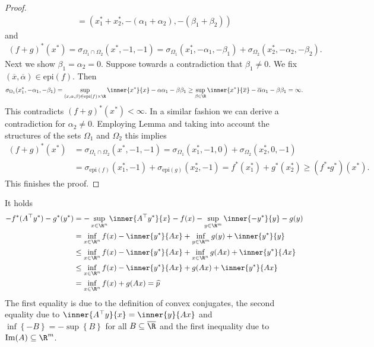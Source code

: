 \begin{proof}
\begin{gather}
    =
    (x^*_1+x^*_2,-(\alpha_1+\alpha_2),-(\beta_1+\beta_2))
  \end{gather}
  and
  \begin{gather}
    (f+g)^*(x^*)
    =
    \sigma_{\Omega_1\cap\Omega_2}
    (x^*,-1,-1)
    =
    \sigma_{\Omega_1}
    (x^*_1,-\alpha_1,-\beta_1)
    +
    \sigma_{\Omega_2}
    (x^*_2,-\alpha_2,-\beta_2).
  \end{gather}
  Next we show
  $\beta_1=\alpha_2=0.$
  Suppose towards a contradiction that 
  $\beta_1\neq 0.$ 
  We fix 
  $(\overline{x},\overline{\alpha})\in\mathrm{epi}(f).$
  Then
  \begin{gather}
    \sigma_{\Omega_1}
    (x^*_1,-\alpha_1,-\beta_1)
    =
    \sup_{(x,\alpha,\beta)\in \mathrm{epi}(f)\times \R}
    \inner{x^*}{x}-\alpha \alpha_1 -\beta \beta_1
    \ge
    \sup_{\beta\in \R}
    \inner{x^*}{\overline{x}}-\overline{\alpha} \alpha_1 -\beta \beta_1
    =\infty.
  \end{gather}
  This contradicts
  $
    (f+g)^*(x^*)<\infty.
  $
  In a similar fashion we can derive a contradiction for $\alpha_2\neq0.$
  Employing Lemma and taking into account the structures of the sets 
  $\Omega_1$ and $\Omega_2$ this implies
  \begin{align}
    (f+g)^*(x^*)
    &=
    \sigma_{\Omega_1\cap\Omega_2}
    (x^*,-1,-1)
    =
    \sigma_{\Omega_1}
    (x^*_1,-1,0)
    +
    \sigma_{\Omega_2}
    (x^*_2,0,-1)
    \\
    &=
    \sigma_{\mathrm{epi}(f)}(x^*_1,-1)
    +
    \sigma_{\mathrm{epi}(g)}(x^*_2,-1)
    =
    f^*(x^*_1)
    +
    g^*(x^*_2)
    \ge
    (f^*\square g^*)(x^*).
  \end{align}
  This finishes the proof.
\end{proof}
It holds
  \begin{align*}
    - f^*(A^\top y^*) - g^*(y^*) 
    &=
      -\sup_{x\in \R^n}\inner{A^\top y^*}{x}-f(x)
      -\sup_{y\in \R^m}\inner{-y^*}{y}-g(y)
      \\
    &=
    \inf_{x\in \R^n}f(x)-\inner{y^*}{Ax}
      +\inf_{y\in \R^m}g(y)+\inner{y^*}{y}
      \\
    &\le
      \inf_{x\in \R^n}f(x)-\inner{y^*}{Ax}
      +\inf_{x\in \R^n}g(Ax)+\inner{y^*}{Ax}
      \\
    &\le
      \inf_{x\in \R^n}f(x)-\inner{y^*}{Ax} + g(Ax) + \inner{y^*}{Ax}
      \\
    &=  
      \inf_{x\in \R^n}f(x)+g(Ax)
    =
      \widehat{p}
  \end{align*}
  The first equality is due to the definition of convex conjugates, the second equality due to $\inner{A^\top y}{x}=\inner{y}{Ax}$ and $\inf \left\{ -B \right\}=-\sup \left\{ B \right\}$ for all $B \subseteq \overline{\R}$ and the first inequality due to $\mathrm{Im}(A)\subseteq \R^m$.
